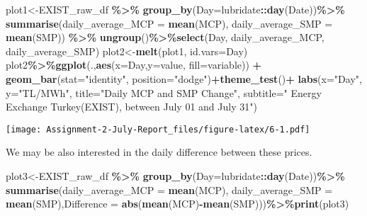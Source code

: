 \documentclass[
]{article}
\newenvironment{Shaded}{\begin{snugshade}}{\end{snugshade}}
\newcommand{\DataTypeTok}[1]{\textcolor[rgb]{0.13,0.29,0.53}{#1}}
\newcommand{\KeywordTok}[1]{\textcolor[rgb]{0.13,0.29,0.53}{\textbf{#1}}}
\newcommand{\NormalTok}[1]{#1}
\newcommand{\OperatorTok}[1]{\textcolor[rgb]{0.81,0.36,0.00}{\textbf{#1}}}
\newcommand{\StringTok}[1]{\textcolor[rgb]{0.31,0.60,0.02}{#1}}
\begin{document}
\begin{Shaded}
\begin{Highlighting}[]
\NormalTok{plot1\textless{}{-}EXIST\_raw\_df }\OperatorTok{\%\textgreater{}\%}\StringTok{ }\KeywordTok{group\_by}\NormalTok{(}\DataTypeTok{Day=}\NormalTok{lubridate}\OperatorTok{::}\KeywordTok{day}\NormalTok{(Date))}\OperatorTok{\%\textgreater{}\%}\StringTok{ }\KeywordTok{summarise}\NormalTok{(}\DataTypeTok{daily\_average\_MCP =} \KeywordTok{mean}\NormalTok{(MCP), }\DataTypeTok{daily\_average\_SMP =} \KeywordTok{mean}\NormalTok{(SMP)) }\OperatorTok{\%\textgreater{}\%}\StringTok{ }
\StringTok{      }\KeywordTok{ungroup}\NormalTok{()}\OperatorTok{\%\textgreater{}\%}\KeywordTok{select}\NormalTok{(Day, daily\_average\_MCP, daily\_average\_SMP)}
\NormalTok{plot2\textless{}{-}}\KeywordTok{melt}\NormalTok{(plot1, }\DataTypeTok{id.vars=}\StringTok{\textquotesingle{}Day\textquotesingle{}}\NormalTok{)}
\NormalTok{plot2}\OperatorTok{\%\textgreater{}\%}\KeywordTok{ggplot}\NormalTok{(.,}\KeywordTok{aes}\NormalTok{(}\DataTypeTok{x=}\NormalTok{Day,}\DataTypeTok{y=}\NormalTok{value, }\DataTypeTok{fill=}\NormalTok{variable)) }\OperatorTok{+}\StringTok{ }\KeywordTok{geom\_bar}\NormalTok{(}\DataTypeTok{stat=}\StringTok{"identity"}\NormalTok{, }\DataTypeTok{position=}\StringTok{"dodge"}\NormalTok{)}\OperatorTok{+}\KeywordTok{theme\_test}\NormalTok{()}\OperatorTok{+}
\StringTok{      }\KeywordTok{labs}\NormalTok{(}\DataTypeTok{x=}\StringTok{"Day"}\NormalTok{, }\DataTypeTok{y=}\StringTok{"TL/MWh"}\NormalTok{, }
           \DataTypeTok{title=}\StringTok{"Daily MCP and SMP Change"}\NormalTok{,}
           \DataTypeTok{subtitle=}\StringTok{" Energy Exchange Turkey(EXIST), between July 01 and July 31"}\NormalTok{)}
\end{Highlighting}
\end{Shaded}

\texttt{[image: Assignment-2-July-Report\_files/figure-latex/6-1.pdf]}

We may be also interested in the daily difference between these prices.

\begin{Shaded}
\begin{Highlighting}[]
\NormalTok{plot3\textless{}{-}EXIST\_raw\_df }\OperatorTok{\%\textgreater{}\%}\StringTok{ }\KeywordTok{group\_by}\NormalTok{(}\DataTypeTok{Day=}\NormalTok{lubridate}\OperatorTok{::}\KeywordTok{day}\NormalTok{(Date))}\OperatorTok{\%\textgreater{}\%}\StringTok{ }\KeywordTok{summarise}\NormalTok{(}\DataTypeTok{daily\_average\_MCP =} \KeywordTok{mean}\NormalTok{(MCP), }\DataTypeTok{daily\_average\_SMP =} \KeywordTok{mean}\NormalTok{(SMP),}\DataTypeTok{Difference =} \KeywordTok{abs}\NormalTok{(}\KeywordTok{mean}\NormalTok{(MCP)}\OperatorTok{{-}}\KeywordTok{mean}\NormalTok{(SMP)))}\OperatorTok{\%\textgreater{}\%}\KeywordTok{print}\NormalTok{(plot3)}
\end{Highlighting}
\end{Shaded}
\end{document}
